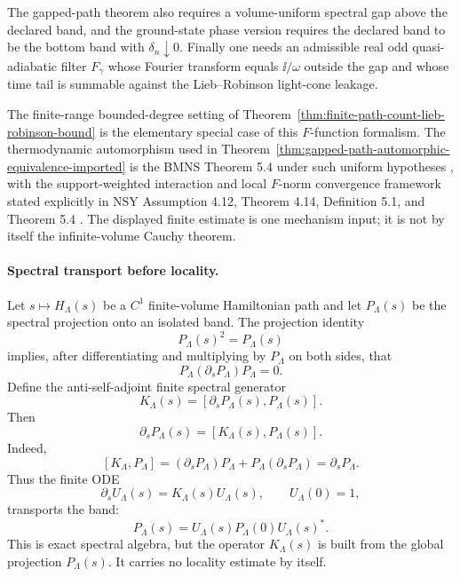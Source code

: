 \begin{definition}
The gapped-path theorem also requires a volume-uniform spectral gap above the
declared band, and the ground-state phase version requires the declared band
to be the bottom band with \(\delta_n\downarrow0\).  Finally one needs an
admissible real odd quasi-adiabatic filter \(F_\gamma\) whose Fourier
transform equals \(\ii/\omega\) outside the gap and whose time tail is
summable against the Lieb--Robinson light-cone leakage.
\end{definition}

The finite-range bounded-degree setting of
Theorem~\ref{thm:finite-path-count-lieb-robinson-bound} is the elementary
special case of this \(F\)-function formalism.  The thermodynamic
automorphism used in
Theorem~\ref{thm:gapped-path-automorphic-equivalence-imported} is the
BMNS Theorem 5.4 under such uniform hypotheses
\cite{BachmannMichalakisNachtergaeleSims2012Automorphic}, with the
support-weighted interaction and local \(F\)-norm convergence framework stated
explicitly in NSY Assumption 4.12, Theorem 4.14, Definition 5.1, and Theorem
5.4
\cite{NachtergaeleSims2006LiebRobinsonClustering,
NachtergaeleSimsYoung2019QuasiLocality}.  The displayed finite estimate is
one mechanism input; it is not by itself the infinite-volume Cauchy theorem.

\paragraph{Spectral transport before locality.}
Let \(s\mapsto H_\Lambda(s)\) be a \(C^1\) finite-volume Hamiltonian path and
let \(P_\Lambda(s)\) be the spectral projection onto an isolated band.  The
projection identity
\[
  P_\Lambda(s)^2=P_\Lambda(s)
\]
implies, after differentiating and multiplying by \(P_\Lambda\) on both
sides, that
\[
  P_\Lambda(\partial_sP_\Lambda)P_\Lambda=0.
\]
Define the anti-self-adjoint finite spectral generator
\[
  K_\Lambda(s)=[\partial_sP_\Lambda(s),P_\Lambda(s)].
\]
Then
\begin{equation}
  \partial_sP_\Lambda(s)=[K_\Lambda(s),P_\Lambda(s)].
  \label{eq:finite-projection-spectral-flow}
\end{equation}
Indeed,
\[
  [K_\Lambda,P_\Lambda]
  =
  (\partial_sP_\Lambda)P_\Lambda+P_\Lambda(\partial_sP_\Lambda)
  =
  \partial_sP_\Lambda .
\]
Thus the finite ODE
\[
  \partial_sU_\Lambda(s)=K_\Lambda(s)U_\Lambda(s),\qquad U_\Lambda(0)=1,
\]
transports the band:
\[
  P_\Lambda(s)=U_\Lambda(s)P_\Lambda(0)U_\Lambda(s)^*.
\]
This is exact spectral algebra, but the operator \(K_\Lambda(s)\) is built
from the global projection \(P_\Lambda(s)\).  It carries no locality estimate
by itself.

